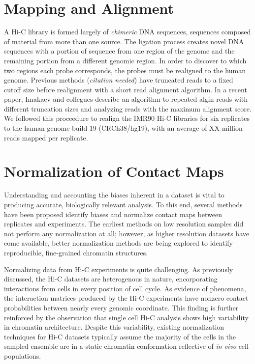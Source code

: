 \documentclass[phd,tocprelim]{cornell}
\begin{document}




\section{Mapping and Alignment}

A Hi-C library is formed largely of \textit{chimeric} DNA sequences,
sequences composed of material from more than one source.  The ligation process
creates novel DNA sequences with a portion of sequence from one region of
the genome and the remaining portion from a different genomic region.  In
order to discover to which two regions each probe corresponds, the probes
must be realigned to the human genome.  Previous methods (\textit{citation needed})
have truncated reads to a fixed cutoff size before realignment with a short
read alignment algorithm.  In a recent paper, Imakaev and collegues
describe an algorithm to repeated algin reads with different truncation sizes
and analyzing reads with the maximum alignment score\cite{imakaev2012}.  We followed
this proceedure to realign the IMR90 Hi-C libraries for six replicates to
the human genome build 19 (CRCh38/hg19), with an average of XX million reads
mapped per replicate.

\section{Normalization of Contact Maps}

Understanding and accounting the biases inherent in a dataset is vital to
producing accurate, biologically relevant analysis.  To this end, several methods
have been proposed identify biases and normalize contact maps between replicates
and experiments\cite{yaffe2011}\cite{hu2012}\cite{yang2014}.  The earliest methods on low
resolution samples did not perform any normalization at all\cite{aiden2009};
however, as higher resolution datasets have come available, better
normalization methods are being explored to identify reproducible,
fine-grained chromatin structures.

Normalizing data from Hi-C experiments is quite challenging.  As previously
discussed, the Hi-C datasets are heterogenous in nature, encorporating
interactions from cells in every position of cell cycle.  As evidence of phenomena,
the interaction matrices produced by the Hi-C experiments have nonzero contact
probabilities between nearly every genomic coordinate\cite{dekker2013}.  This
finding is further reinforced by the observation that single cell Hi-C analysis
shows high variability in chromatin architecture\cite{nagano2013}.  Despite this
variability, existing normalization techniques for Hi-C datasets typically
assume the majority of the cells in the sampled ensemble are in a static
chromatin conformation reflective of \textit{in vivo} cell populations.
\end{document}
